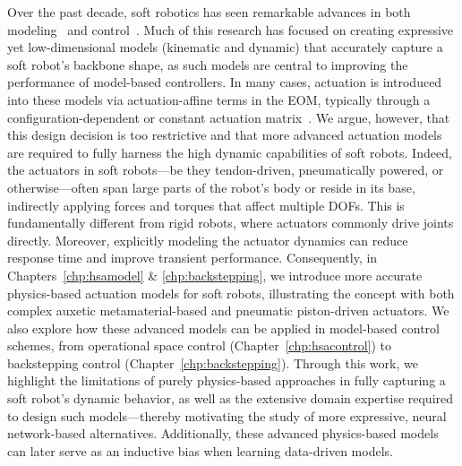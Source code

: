 Over the past decade, soft robotics has seen remarkable advances in both modeling~\citep{armanini2023soft} and control~\citep{della2023model}. Much of this research has focused on creating expressive yet low-dimensional models (kinematic and dynamic) that accurately capture a soft robot’s backbone shape, as such models are central to improving the performance of model-based controllers.
%
In many cases, actuation is introduced into these models via actuation-affine terms in the \gls{EOM}, typically through a configuration-dependent or constant actuation matrix~\citep{della2023model}. We argue, however, that this design decision is too restrictive and that more advanced actuation models are required to fully harness the high dynamic capabilities of soft robots. Indeed, the actuators in soft robots—be they tendon-driven, pneumatically powered, or otherwise—often span large parts of the robot’s body or reside in its base, indirectly applying forces and torques that affect multiple \glspl{DOF}. This is fundamentally different from rigid robots, where actuators commonly drive joints directly.
%
Moreover, explicitly modeling the actuator dynamics can reduce response time and improve transient performance. Consequently, in Chapters~\ref{chp:hsamodel} \& \ref{chp:backstepping}, we introduce more accurate physics-based actuation models for soft robots, illustrating the concept with both complex auxetic metamaterial-based and pneumatic piston-driven actuators. We also explore how these advanced models can be applied in model-based control schemes, from operational space control (Chapter~\ref{chp:hsacontrol}) to backstepping control (Chapter~\ref{chp:backstepping}). Through this work, we highlight the limitations of purely physics-based approaches in fully capturing a soft robot’s dynamic behavior, as well as the extensive domain expertise required to design such models—thereby motivating the study of more expressive, neural network-based alternatives. Additionally, these advanced physics-based models can later serve as an inductive bias when learning data-driven models.

